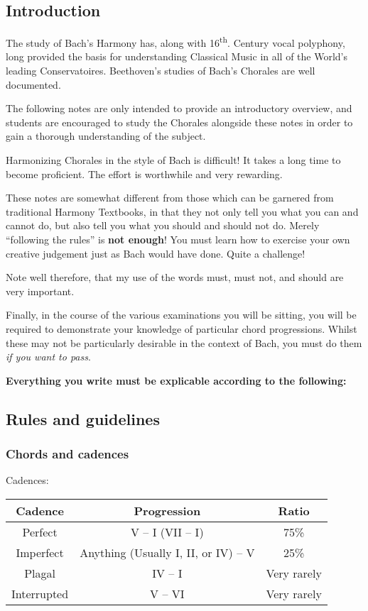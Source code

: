 \documentclass{article}
\begin{document}
\subsection{Introduction}

The study of Bach’s Harmony has, along with 16\textsuperscript{th}.
Century vocal polyphony, long provided the basis for understanding Classical Music in all of the World's leading Conservatoires.
Beethoven’s studies of Bach’s Chorales are well documented.

The following notes are only intended to provide an introductory overview, and students are encouraged to study the Chorales alongside these notes in order to gain a thorough understanding of the subject.

Harmonizing Chorales in the style of Bach is difficult!
It takes a long time to become proficient.
The effort is worthwhile and very rewarding.

These notes are somewhat different from those which can be garnered from traditional Harmony Textbooks, in that they not only tell you what you can and cannot do, but also tell you what you should and should not do.
Merely ``following the rules'' is \textbf{not enough}!
You must learn how to exercise your own creative judgement just as Bach would have done.
Quite a challenge!

Note well therefore, that my use of the words must, must not, and should are very important.

Finally, in the course of the various examinations you will be sitting, you will be required to demonstrate your knowledge of particular chord progressions.
Whilst these may not be particularly desirable in the context of Bach, you must do them \emph{if you want to pass}.

\textbf{Everything you write must be explicable according to the following:}

\subsection{Rules and guidelines}

\subsubsection{Chords and cadences}

Cadences:

\begin{center}
\begin{tabular}{||c|c|c||}
    \hline
    Cadence & Progression & Ratio \\
    \hline
    Perfect & V -- I (VII -- I) & 75\% \\
    Imperfect & Anything (Usually I, II, or IV) -- V & 25\% \\
    Plagal & IV -- I & Very rarely \\
    Interrupted & V -- VI & Very rarely \\
    \hline
\end{tabular}
\end{center}
\end{document}
